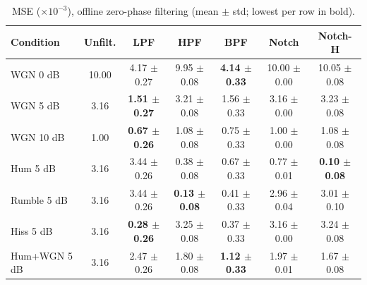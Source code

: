 \begin{table}[!t]
\caption{MSE ($\times10^{-3}$), offline zero-phase filtering (mean $\pm$ std; lowest per row in bold).}
\label{tab:mse_zp}
\centering\footnotesize
\begin{tabular}{lcccccc}
\hline
Condition & Unfilt. & LPF & HPF & BPF & Notch & Notch-H \\ \hline
WGN 0 dB & 10.00 & 4.17 $\pm$ 0.27 & 9.95 $\pm$ 0.08 & \textbf{4.14 $\pm$ 0.33} & 10.00 $\pm$ 0.00 & 10.05 $\pm$ 0.08 \\
WGN 5 dB & 3.16 & \textbf{1.51 $\pm$ 0.27} & 3.21 $\pm$ 0.08 & 1.56 $\pm$ 0.33 & 3.16 $\pm$ 0.00 & 3.23 $\pm$ 0.08 \\
WGN 10 dB & 1.00 & \textbf{0.67 $\pm$ 0.26} & 1.08 $\pm$ 0.08 & 0.75 $\pm$ 0.33 & 1.00 $\pm$ 0.00 & 1.08 $\pm$ 0.08 \\
Hum 5 dB & 3.16 & 3.44 $\pm$ 0.26 & 0.38 $\pm$ 0.08 & 0.67 $\pm$ 0.33 & 0.77 $\pm$ 0.01 & \textbf{0.10 $\pm$ 0.08} \\
Rumble 5 dB & 3.16 & 3.44 $\pm$ 0.26 & \textbf{0.13 $\pm$ 0.08} & 0.41 $\pm$ 0.33 & 2.96 $\pm$ 0.04 & 3.01 $\pm$ 0.10 \\
Hiss 5 dB & 3.16 & \textbf{0.28 $\pm$ 0.26} & 3.25 $\pm$ 0.08 & 0.37 $\pm$ 0.33 & 3.16 $\pm$ 0.00 & 3.24 $\pm$ 0.08 \\
Hum+WGN 5 dB & 3.16 & 2.47 $\pm$ 0.26 & 1.80 $\pm$ 0.08 & \textbf{1.12 $\pm$ 0.33} & 1.97 $\pm$ 0.01 & 1.67 $\pm$ 0.08 \\
\hline
\end{tabular}

\end{table}